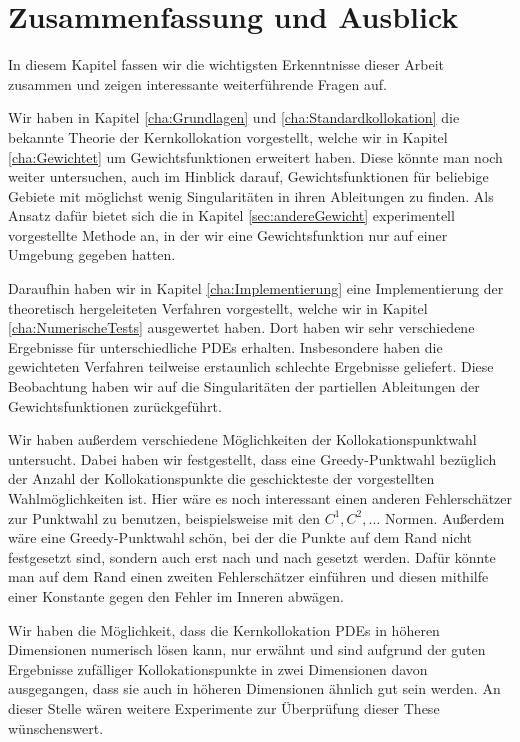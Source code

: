 \chapter{Zusammenfassung und Ausblick}
\label{cha:schluss}

In diesem Kapitel fassen wir die wichtigsten Erkenntnisse dieser Arbeit zusammen und zeigen interessante weiterführende Fragen auf.

Wir haben in Kapitel \ref{cha:Grundlagen} und \ref{cha:Standardkollokation} die bekannte Theorie der Kernkollokation vorgestellt, welche wir in Kapitel \ref{cha:Gewichtet} um Gewichtsfunktionen erweitert haben. Diese könnte man noch weiter untersuchen, auch im Hinblick darauf, Gewichtsfunktionen für beliebige Gebiete mit möglichst wenig Singularitäten in ihren Ableitungen zu finden. Als Ansatz dafür bietet sich die in Kapitel \ref{sec:andereGewicht} experimentell vorgestellte Methode an, in der wir eine Gewichtsfunktion nur auf einer Umgebung gegeben hatten.

Daraufhin haben wir in Kapitel \ref{cha:Implementierung} eine Implementierung der theoretisch hergeleiteten Verfahren vorgestellt, welche wir in Kapitel \ref{cha:NumerischeTests} ausgewertet haben. Dort haben wir sehr verschiedene Ergebnisse für unterschiedliche \acp{PDE} erhalten. Insbesondere haben die gewichteten Verfahren teilweise erstaunlich schlechte Ergebnisse geliefert. Diese Beobachtung haben wir auf die Singularitäten der partiellen Ableitungen der Gewichtsfunktionen zurückgeführt.

Wir haben außerdem verschiedene Möglichkeiten der Kollokationspunktwahl untersucht. Dabei haben wir festgestellt, dass eine Greedy-Punktwahl bezüglich der Anzahl der Kollokationspunkte die geschickteste der vorgestellten Wahlmöglichkeiten ist. Hier wäre es noch interessant einen anderen Fehlerschätzer zur Punktwahl zu benutzen, beispielsweise mit den $C^1, C^2, \dots$ Normen. Außerdem wäre eine Greedy-Punktwahl schön, bei der die Punkte auf dem Rand nicht festgesetzt sind, sondern auch erst nach und nach gesetzt werden. Dafür könnte man auf dem Rand einen zweiten Fehlerschätzer einführen und diesen mithilfe einer Konstante gegen den Fehler im Inneren abwägen.

Wir haben die Möglichkeit, dass die Kernkollokation \acp{PDE} in höheren Dimensionen numerisch lösen kann, nur erwähnt und sind aufgrund der guten Ergebnisse zufälliger Kollokationspunkte in zwei Dimensionen davon ausgegangen, dass sie auch in höheren Dimensionen ähnlich gut sein werden. An dieser Stelle wären weitere Experimente zur Überprüfung dieser These wünschenswert.

